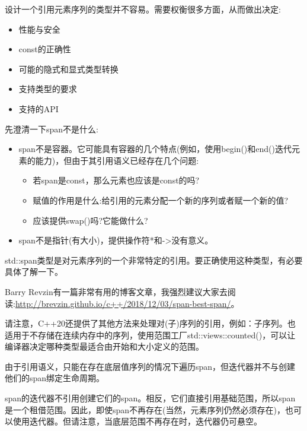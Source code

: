 
设计一个引用元素序列的类型并不容易。需要权衡很多方面，从而做出决定:

\begin{itemize}
\item
性能与安全

\item
const的正确性

\item
可能的隐式和显式类型转换

\item
支持类型的要求

\item
支持的API
\end{itemize}

先澄清一下span不是什么:

\begin{itemize}
\item
span不是容器。它可能具有容器的几个特点(例如，使用begin()和end()迭代元素的能力)，但由于其引用语义已经存在几个问题:

\begin{itemize}
\item
若span是const，那么元素也应该是const的吗?

\item
赋值的作用是什么:给引用的元素分配一个新的序列或者赋一个新的值?

\item
应该提供swap()吗?它能做什么?
\end{itemize}

\item
span不是指针(有大小)，提供操作符*和->没有意义。
\end{itemize}

std::span类型是对元素序列的一个非常特定的引用。要正确使用这种类型，有必要具体了解一下。

Barry Revzin有一篇非常有用的博客文章，我强烈建议大家去阅读:\url{http://brevzin.github.io/c++/2018/12/03/span-best-span/}。

请注意，C++20还提供了其他方法来处理对(子)序列的引用，例如：子序列。也适用于不存储在连续内存中的序列，使用范围工厂std::views::counted()，可以让编译器决定哪种类型最适合由开始和大小定义的范围。


由于引用语义，只能在存在底层值序列的情况下遍历span，但迭代器并不与创建他们的span绑定生命周期。

span的迭代器不引用创建它们的span。相反，它们直接引用基础范围，所以span是一个租借范围。因此，即使span不再存在(当然，元素序列仍然必须存在)，也可以使用迭代器。但请注意，当底层范围不再存在时，迭代器仍可悬空。

